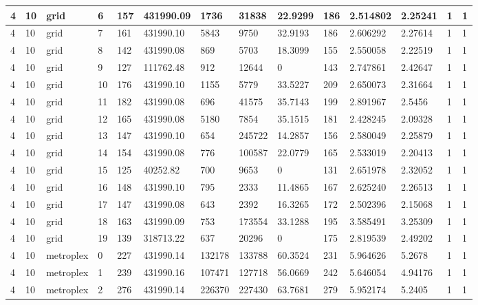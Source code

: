 \documentclass[../thesis.tex]{subfiles}
\begin{document}
\begin{table}[!ht]
\begin{tabularx}{\textwidth}{|X|X|X|X|X|X|X|X|X|X|X|X|X|X|}
        4 & 10 & grid & 6 & 157 & 431990.09 & 1736 & 31838 & 22.9299 & 186 & 2.514802 & 2.25241 & 1 & 1 \\ \hline
        4 & 10 & grid & 7 & 161 & 431990.10 & 5843 & 9750 & 32.9193 & 186 & 2.606292 & 2.27614 & 1 & 1 \\ \hline
        4 & 10 & grid & 8 & 142 & 431990.08 & 869 & 5703 & 18.3099 & 155 & 2.550058 & 2.22519 & 1 & 1 \\ \hline
        4 & 10 & grid & 9 & 127 & 111762.48 & 912 & 12644 & 0 & 143 & 2.747861 & 2.42647 & 1 & 1 \\ \hline
        4 & 10 & grid & 10 & 176 & 431990.10 & 1155 & 5779 & 33.5227 & 209 & 2.650073 & 2.31664 & 1 & 1 \\ \hline
        4 & 10 & grid & 11 & 182 & 431990.08 & 696 & 41575 & 35.7143 & 199 & 2.891967 & 2.5456 & 1 & 1 \\ \hline
        4 & 10 & grid & 12 & 165 & 431990.08 & 5180 & 7854 & 35.1515 & 181 & 2.428245 & 2.09328 & 1 & 1 \\ \hline
        4 & 10 & grid & 13 & 147 & 431990.10 & 654 & 245722 & 14.2857 & 156 & 2.580049 & 2.25879 & 1 & 1 \\ \hline
        4 & 10 & grid & 14 & 154 & 431990.08 & 776 & 100587 & 22.0779 & 165 & 2.533019 & 2.20413 & 1 & 1 \\ \hline
        4 & 10 & grid & 15 & 125 & 40252.82 & 700 & 9653 & 0 & 131 & 2.651978 & 2.32052 & 1 & 1 \\ \hline
        4 & 10 & grid & 16 & 148 & 431990.10 & 795 & 2333 & 11.4865 & 167 & 2.625240 & 2.26513 & 1 & 1 \\ \hline
        4 & 10 & grid & 17 & 147 & 431990.08 & 643 & 2392 & 16.3265 & 172 & 2.502396 & 2.15068 & 1 & 1 \\ \hline
        4 & 10 & grid & 18 & 163 & 431990.09 & 753 & 173554 & 33.1288 & 195 & 3.585491 & 3.25309 & 1 & 1 \\ \hline
        4 & 10 & grid & 19 & 139 & 318713.22 & 637 & 20296 & 0 & 175 & 2.819539 & 2.49202 & 1 & 1 \\ \hline
        4 & 10 & metroplex & 0 & 227 & 431990.14 & 132178 & 133788 & 60.3524 & 231 & 5.964626 & 5.2678 & 1 & 1 \\ \hline
        4 & 10 & metroplex & 1 & 239 & 431990.16 & 107471 & 127718 & 56.0669 & 242 & 5.646054 & 4.94176 & 1 & 1 \\ \hline
        4 & 10 & metroplex & 2 & 276 & 431990.14 & 226370 & 227430 & 63.7681 & 279 & 5.952174 & 5.2405 & 1 & 1 \\ \hline

\end{tabularx}
\end{table}
\end{document}
